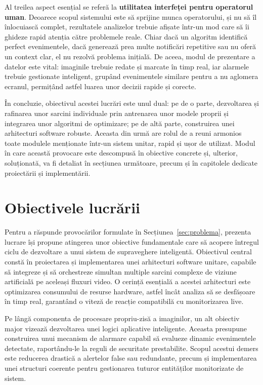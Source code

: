 \documentclass[../../main.tex]{subfiles}
\begin{document}
Al treilea aspect esențial se referă la \textbf{utilitatea interfeței pentru operatorul uman}. Deoarece scopul sistemului este să sprijine munca operatorului, și nu să îl înlocuiască complet, rezultatele analizelor trebuie afișate într-un mod care să îi ghideze rapid atenția către problemele reale. Chiar dacă un algoritm identifică perfect evenimentele, dacă generează prea multe notificări repetitive sau nu oferă un context clar, el nu rezolvă problema inițială. De aceea, modul de prezentare a datelor este vital: imaginile trebuie redate și marcate în timp real, iar alarmele trebuie gestionate inteligent, grupând evenimentele similare pentru a nu aglomera ecranul, permițând astfel luarea unor decizii rapide și corecte.

În concluzie, obiectivul acestei lucrări este unul dual: pe de o parte, dezvoltarea și rafinarea unor sarcini individuale prin antrenarea unor modele proprii și integrarea unor algoritmi de optimizare; pe de altă parte, construirea unei arhitecturi software robuste. Aceasta din urmă are rolul de a reuni armonios toate modulele menționate într-un sistem unitar, rapid și ușor de utilizat. Modul în care această provocare este descompusă în obiective concrete și, ulterior, soluționată, va fi detaliat în secțiunea următoare, precum și în capitolele dedicate proiectării și implementării.

\section{Obiectivele lucrării}
\label{sec:obiective}

Pentru a răspunde provocărilor formulate în Secțiunea~\ref{sec:problema}, prezenta lucrare își propune atingerea unor obiective fundamentale care să acopere întregul ciclu de dezvoltare a unui sistem de supraveghere inteligentă. Obiectivul central constă în proiectarea și implementarea unei arhitecturi software unitare, capabile să integreze și să orchestreze simultan multiple sarcini complexe de viziune artificială pe aceleași fluxuri video. O cerință esențială a acestei arhitecturi este optimizarea consumului de resurse hardware, astfel încât analiza să se desfășoare în timp real, garantând o viteză de reacție compatibilă cu monitorizarea live.

Pe lângă componenta de procesare propriu-zisă a imaginilor, un alt obiectiv major vizează dezvoltarea unei logici aplicative inteligente. Aceasta presupune construirea unui mecanism de alarmare capabil să evalueze dinamic evenimentele detectate, raportându-le la reguli de securitate prestabilite. Scopul acestui demers este reducerea drastică a alertelor false sau redundante, precum și implementarea unei structuri coerente pentru gestionarea tuturor entităților monitorizate de sistem.
\end{document}
